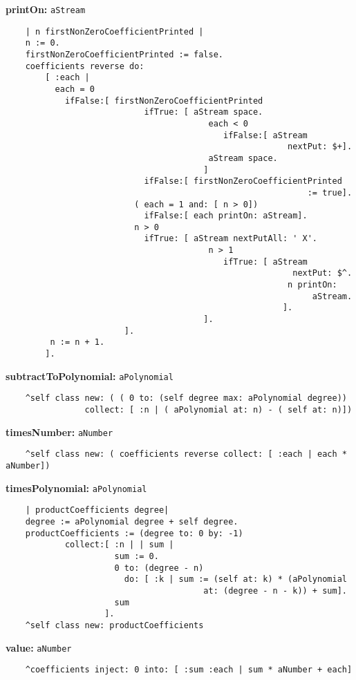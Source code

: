 {\bf printOn:} {\tt aStream}
\begin{verbatim}
    | n firstNonZeroCoefficientPrinted |
    n := 0.
    firstNonZeroCoefficientPrinted := false.
    coefficients reverse do:
        [ :each |
          each = 0
            ifFalse:[ firstNonZeroCoefficientPrinted
                            ifTrue: [ aStream space.
                                         each < 0
                                            ifFalse:[ aStream 
                                                         nextPut: $+].
                                         aStream space.
                                        ]
                            ifFalse:[ firstNonZeroCoefficientPrinted 
                                                             := true].
                          ( each = 1 and: [ n > 0])
                            ifFalse:[ each printOn: aStream].
                          n > 0
                            ifTrue: [ aStream nextPutAll: ' X'.
                                         n > 1
                                            ifTrue: [ aStream 
                                                          nextPut: $^.
                                                         n printOn: 
                                                              aStream.
                                                        ].
                                        ].
                        ].
         n := n + 1.
        ].
\end{verbatim}
{\bf subtractToPolynomial:} {\tt aPolynomial}
\begin{verbatim}
    ^self class new: ( ( 0 to: (self degree max: aPolynomial degree)) 
                collect: [ :n | ( aPolynomial at: n) - ( self at: n)])
\end{verbatim}
{\bf timesNumber:} {\tt aNumber}
\begin{verbatim}
    ^self class new: ( coefficients reverse collect: [ :each | each * aNumber])
\end{verbatim}
{\bf timesPolynomial:} {\tt aPolynomial}
\begin{verbatim}
    | productCoefficients degree|
    degree := aPolynomial degree + self degree.
    productCoefficients := (degree to: 0 by: -1)
            collect:[ :n | | sum |
                      sum := 0.
                      0 to: (degree - n)
                        do: [ :k | sum := (self at: k) * (aPolynomial 
                                        at: (degree - n - k)) + sum].
                      sum
                    ].
    ^self class new: productCoefficients
\end{verbatim}
{\bf value:} {\tt aNumber}
\begin{verbatim}
    ^coefficients inject: 0 into: [ :sum :each | sum * aNumber + each]
\end{verbatim}

